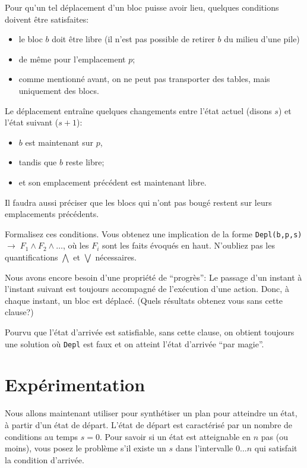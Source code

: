 Pour qu'un tel déplacement d'un bloc puisse avoir lieu, quelques conditions
doivent être satisfaites:

\begin{itemize}
\item le bloc $b$ doit être libre (il n'est pas possible de retirer $b$ du
  milieu d'une pile)
\item de même pour l'emplacement $p$;
\item comme mentionné avant, on ne peut pas transporter des tables, mais
  uniquement des blocs.
\end{itemize}

Le déplacement entraîne quelques changements entre l'état actuel (disons $s$)
et l'état suivant ($s + 1$):
\begin{itemize}
\item $b$ est maintenant sur $p$,
\item tandis que $b$ reste libre;
\item et son emplacement précédent est maintenant libre.
\end{itemize}

Il faudra aussi préciser que les blocs qui n'ont pas bougé restent sur leurs
emplacements précédents.

\begin{exo}\label{ex:depl}
Formalisez ces conditions. Vous obtenez une implication de la forme
  \texttt{Depl(b,p,s) $\to \; F_1 \land F_2 \land \dots$}, où les $F_i$
  sont les faits évoqués en haut.  N'oubliez pas les quantifications
  $\bigwedge$ et $\bigvee$ nécessaires.
\end{exo}

\begin{exo}\label{ex:progr}
Nous avons encore besoin d'une propriété de ``progrès'': Le passage d'un
  instant à l'instant suivant est toujours accompagné de l'exécution d'une
  action. Donc, à chaque instant, un bloc est déplacé.
  (Quels résultats obtenez vous sans cette clause?)
\end{exo}

  Pourvu que l'état d'arrivée est satisfiable, sans cette clause, on obtient
  toujours une solution où \texttt{Depl} est faux et on atteint l'état
  d'arrivée ``par magie''.

\section{Expérimentation}\label{sec:exper}

Nous allons maintenant utiliser \textsc{\touist} pour synthétiser un plan
pour atteindre un état, à partir d'un état de départ. L'état de départ est
caractérisé par un nombre de conditions au temps $s = 0$. Pour savoir si un
état est atteignable en $n$ pas (ou moins), vous posez le problème s'il existe
un $s$ dans l'intervalle $0 \dots n$ qui satisfait la condition d'arrivée. 

